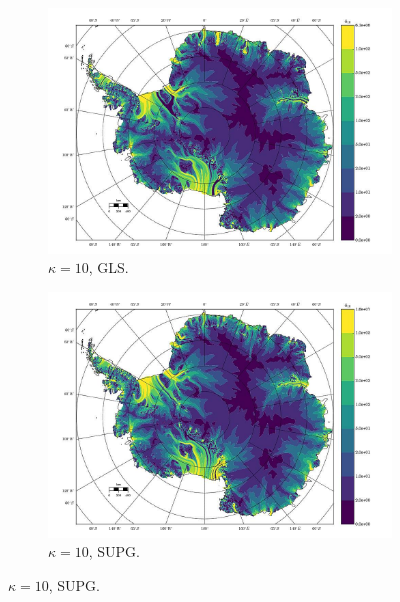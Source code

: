 \begin{figure}
  \begin{subfigure}[b]{0.45\linewidth}
    \includegraphics[width=\linewidth]{images/balance_velocity/antarctica/d_gS_m_U/Ubar_10H_kappa_10_GLS.jpg}
  \caption{$\kappa = 10$, GLS.}
  \label{antarctica_bv_image_d_gS_m_U_kappa_10_GLS}
  \end{subfigure}
  \begin{subfigure}[b]{0.45\linewidth}
    \includegraphics[width=\linewidth]{images/balance_velocity/antarctica/d_gS_m_U/Ubar_10H_kappa_10_SUPG.jpg}
  \caption{$\kappa = 10$, SUPG.}
  \label{antarctica_bv_image_d_gS_m_U_kappa_10_SUPG}
  \end{subfigure}
  

\end{figure}
